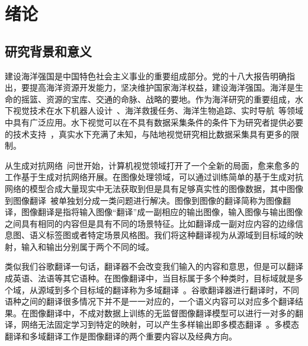 \chapter{绪论}
\section{研究背景和意义}

建设海洋强国是中国特色社会主义事业的重要组成部分。党的十八大报告明确指出，要提高海洋资源开发能力，坚决维护国家海洋权益，建设海洋强国。海洋是生命的摇篮、资源的宝库、交通的命脉、战略的要地。作为海洋研究的重要组成，水下视觉技术在水下机器人设计~\cite{kim2012object,li2020object}、海洋救援任务、海洋生物追踪、实时导航~\cite{chen2012real}等领域中具有广泛应用。水下视觉可以在不具有数据采集条件的条件下为研究者提供必要的技术支持~\cite{ludvigsen2007applications,万媛媛2012水下光视觉目标检测与定位系统关键技术研究}，真实水下充满了未知，与陆地视觉研究相比数据采集具有更多的限制。

从生成对抗网络~\cite{goodfellow2014generative}问世开始，计算机视觉领域打开了一个全新的局面，愈来愈多的工作基于生成对抗网络开展。在图像处理领域，可以通过训练简单的基于生成对抗网络的模型合成大量现实中无法获取到但是具有足够真实性的图像数据，其中图像到图像翻译~\cite{isola2017image}被单独划分成一类问题进行解决。图像到图像的翻译简称为图像翻译，图像翻译是指将输入图像“翻译”成一副相应的输出图像，输入图像与输出图像之间具有相同的内容但是具有不同的场景特征。比如翻译成一副对应内容的边缘信息图、语义标签图或者特定场景风格图。我们将这种翻译视为从源域到目标域的映射，输入和输出分别属于两个不同的域。


类似我们谷歌翻译一句话，翻译器不会改变我们输入的内容和意思，但是可以翻译成英语、法语等其它语种。在图像翻译中，当目标属于多个种类时，目标域就是多个域，从源域到多个目标域的翻译称为多域翻译~\cite{choi2018stargan,choi2020stargan,lee2020drit++}。谷歌翻译器进行翻译时，不同语种之间的翻译很多情况下并不是一一对应的，一个语义内容可以对应多个翻译结果。在图像翻译中，不成对数据上训练的无监督图像翻译模型可以进行一对多的翻译，网络无法固定学习到特定的映射，可以产生多样输出即多模态翻译~\cite{huang2018multimodal,lee2018diverse,lee2020drit++}。多模态翻译和多域翻译工作是图像翻译的两个重要内容以及经典方向。

